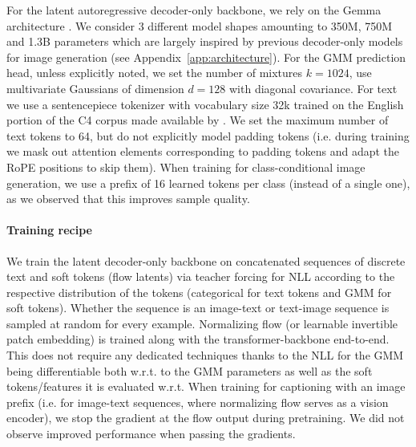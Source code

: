 \documentclass{article} %
\begin{document}
For the latent autoregressive decoder-only backbone, we rely on the Gemma architecture \citep{team2024gemma}. We consider 3 different model shapes amounting to 350M, 750M and 1.3B parameters which are largely inspired by previous decoder-only models for image generation \citep{esser2020taming} (see Appendix~\ref{app:architecture}). For the GMM prediction head, unless explicitly noted, we set the number of mixtures $k=1024$, use multivariate Gaussians of dimension $d=128$ with diagonal covariance.
For text we use a sentencepiece tokenizer with vocabulary size 32k trained on the English portion of the C4 corpus made available by \cite{t5}.
We set the maximum number of text tokens to 64, but do not explicitly model padding tokens (i.e. during training we mask out attention elements corresponding to padding tokens and adapt the RoPE positions to skip them). When training for class-conditional image generation, we use a prefix of 16 learned tokens per class (instead of a single one), as we observed that this improves sample quality.

\paragraph{Training recipe} We train the latent decoder-only backbone on concatenated sequences of discrete text and soft tokens (flow latents) via teacher forcing for NLL according to the respective distribution of the tokens (categorical for text tokens and GMM for soft tokens). Whether the sequence is an image-text or text-image sequence is sampled at random for every example. Normalizing flow (or learnable invertible patch embedding) is trained along with the transformer-backbone end-to-end. This does not require any dedicated techniques thanks to the NLL for the GMM being differentiable both w.r.t. to the GMM parameters as well as the soft tokens/features it is evaluated w.r.t. When training for captioning with an image prefix (i.e. for image-text sequences, where normalizing flow serves as a vision encoder), we stop the gradient at the flow output during pretraining. We did not observe improved performance when passing the gradients.
\end{document}
